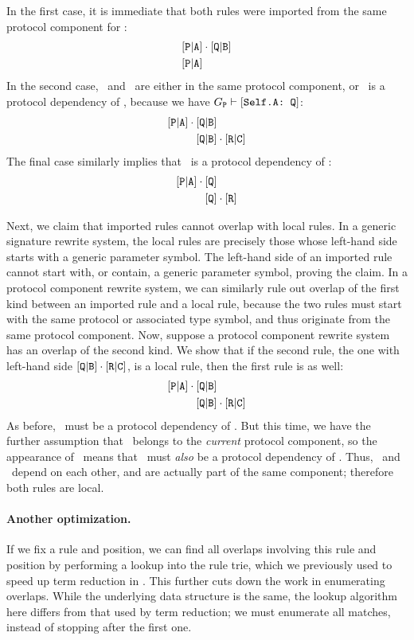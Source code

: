 \documentclass[../generics]{subfiles}
\begin{document}
In the first case, it is immediate that both rules were imported from the same protocol component for \tP:
\begin{align*}
&[\texttt{P}|\texttt{A}]\cdot[\texttt{Q}|\texttt{B}]\\
&[\texttt{P}|\texttt{A}]
\end{align*}
In the second case, \tP\ and \tQ\ are either in the same protocol component, or \tQ\ is a protocol dependency of \tP, because we have $G_{\texttt{P}}\vdash[\texttt{Self.A:~Q}]$:
\begin{align*}
[\texttt{P}|\texttt{A}]\cdot{}&[\texttt{Q}|\texttt{B}]\\
&[\texttt{Q}|\texttt{B}]\cdot[\texttt{R}|\texttt{C}]
\end{align*}
The final case similarly implies that \tQ\ is a protocol dependency of \tP:
\begin{align*}
[\texttt{P}|\texttt{A}]\cdot{}&[\texttt{Q}]\\
&[\texttt{Q}]\cdot[\texttt{R}]
\end{align*}

Next, we claim that imported rules cannot overlap with local rules. In a generic signature rewrite system, the local rules are precisely those whose left-hand side starts with a generic parameter symbol. The left-hand side of an imported rule cannot start with, or contain, a generic parameter symbol, proving the claim. In a protocol component rewrite system, we can similarly rule out overlap of the first kind between an imported rule and a local rule, because the two rules must start with the same protocol or associated type symbol, and thus originate from the same protocol component. Now, suppose a protocol component rewrite system has an overlap of the second kind. We show that if the second rule, the one with left-hand side $[\texttt{Q}|\texttt{B}]\cdot[\texttt{R}|\texttt{C}]$, is a local rule, then the first rule is as well:
\begin{align*}
[\texttt{P}|\texttt{A}]\cdot{}&[\texttt{Q}|\texttt{B}]\\
&[\texttt{Q}|\texttt{B}]\cdot[\texttt{R}|\texttt{C}]
\end{align*}
As before, \tQ\ must be a protocol dependency of \tP. But this time, we have the further assumption that \tQ\ belongs to the \emph{current} protocol component, so the appearance of \tP\ means that \tP\ must \emph{also} be a protocol dependency of \tQ. Thus, \tP\ and \tQ\ depend on each other, and are actually part of the same component; therefore both rules are local.

\paragraph{Another optimization.} If we fix a rule and position, we can find all overlaps involving this rule and position by performing a lookup into the rule trie, which we previously used to speed up term reduction in . This further cuts down the work in enumerating overlaps. While the underlying data structure is the same, the lookup algorithm here differs from that used by term reduction; we must enumerate all matches, instead of stopping after the first one.
\end{document}
